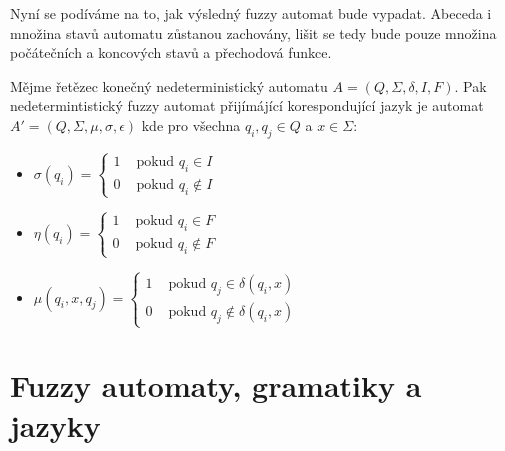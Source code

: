\documentclass[a4paper,10pt]{article}
\begin{document}
Nyní se podíváme na to, jak výsledný fuzzy automat bude vypadat. Abeceda i množina stavů automatu zůstanou zachovány, lišit se tedy bude pouze množina počátečních a koncových stavů a přechodová funkce. 

\begin{definition} \label{def-FuzzAutBivAut}
  Mějme řetězec konečný nedeterministický automatu $A = ( Q, \Sigma, \delta, I, F )$. Pak nedetermintistický fuzzy automat přijímájící korespondující jazyk je automat $A' = ( Q, \Sigma, \mu, \sigma, \epsilon )$ kde pro všechna $q_i, q_j \in Q$ a $x \in \Sigma$:
  \begin{itemize}
   \item $\sigma(q_i) =
    \begin{cases}
     1 & \text{ pokud } q_i \in I \\
     0 & \text{ pokud } q_i \notin I
    \end{cases}$
    
   \item $\eta(q_i) =
    \begin{cases}
     1 & \text{ pokud } q_i \in F \\
     0 & \text{ pokud } q_i \notin F
    \end{cases}$
    
    \item $\mu(q_i, x, q_j) = 
     \begin{cases}
      1 & \text{ pokud } q_j \in \delta(q_i, x) \\
      0 & \text{ pokud } q_j \notin \delta(q_i, x)
     \end{cases}$
  \end{itemize}
\end{definition}




\section{Fuzzy automaty, gramatiky a jazyky}
\end{document}
